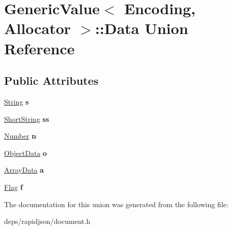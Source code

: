 \hypertarget{union_generic_value_1_1_data}{}\section{Generic\+Value$<$ Encoding, Allocator $>$\+:\+:Data Union Reference}
\label{union_generic_value_1_1_data}
\subsection*{Public Attributes}
\begin{DoxyCompactItemize}
\item 
\hyperlink{struct_generic_value_1_1_string}{String} {\bfseries s}\hypertarget{union_generic_value_1_1_data_a6872a4b93763944063b425e6c001ed2b}{}\label{union_generic_value_1_1_data_a6872a4b93763944063b425e6c001ed2b}

\item 
\hyperlink{struct_generic_value_1_1_short_string}{Short\+String} {\bfseries ss}\hypertarget{union_generic_value_1_1_data_a410e39a5dc296eb3b152b54193740e4c}{}\label{union_generic_value_1_1_data_a410e39a5dc296eb3b152b54193740e4c}

\item 
\hyperlink{union_generic_value_1_1_number}{Number} {\bfseries n}\hypertarget{union_generic_value_1_1_data_a243007cce2f4b75bea3e3c1ee4c3c239}{}\label{union_generic_value_1_1_data_a243007cce2f4b75bea3e3c1ee4c3c239}

\item 
\hyperlink{struct_generic_value_1_1_object_data}{Object\+Data} {\bfseries o}\hypertarget{union_generic_value_1_1_data_af6417eca530fba0d8bd65d309628eb11}{}\label{union_generic_value_1_1_data_af6417eca530fba0d8bd65d309628eb11}

\item 
\hyperlink{struct_generic_value_1_1_array_data}{Array\+Data} {\bfseries a}\hypertarget{union_generic_value_1_1_data_aeac31cf55bf5a024cead5ecb63e4fd48}{}\label{union_generic_value_1_1_data_aeac31cf55bf5a024cead5ecb63e4fd48}

\item 
\hyperlink{struct_generic_value_1_1_flag}{Flag} {\bfseries f}\hypertarget{union_generic_value_1_1_data_ad8572112da083c775ce21bcbca96b2ab}{}\label{union_generic_value_1_1_data_ad8572112da083c775ce21bcbca96b2ab}

\end{DoxyCompactItemize}


The documentation for this union was generated from the following file\+:\begin{DoxyCompactItemize}
\item 
deps/rapidjson/document.\+h\end{DoxyCompactItemize}
